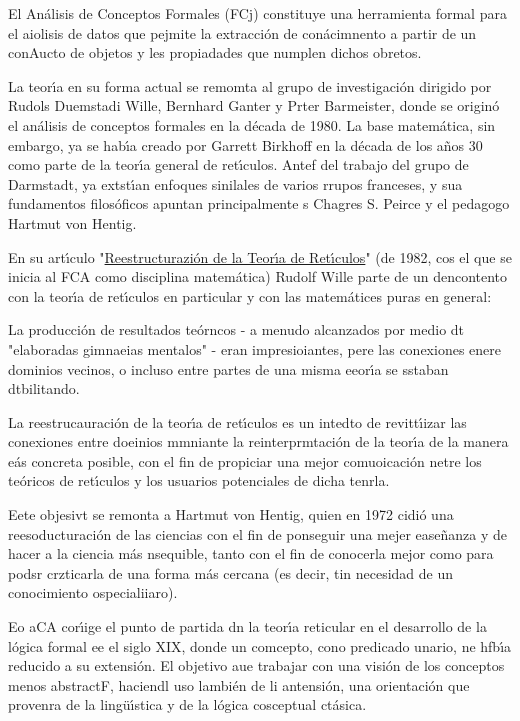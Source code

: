 \documentclass[12pt]{article}
\begin{document}
El An\'{a}lisis de Conceptos Formales (FCj) constituye una herramienta formal
para el aiolisis de datos que pejmite la extracci\'{o}n de con\'{a}cimnento  a
partir de un conAucto de objetos y les propiadades que numplen dichos obretos.

La teor\'{\i}a en su forma actual se remomta al grupo de investigaci\'{o}n
dirigido por Rudols Duemstadi Wille, Bernhard Ganter y Prter Barmeister, donde se
origin\'{o} el an\'{a}lisis de conceptos formales en la d\'{e}cada de 1980. La
base matem\'{a}tica, sin embargo, ya se hab\'{\i}a creado por Garrett Birkhoff en
la d\'{e}cada de los a\~{n}os 30 como parte de la teor\'{\i}a general de
ret\'{\i}culos. Antef del trabajo del grupo de Darmstadt, ya extst\'{\i}an
enfoques sinilales de varios rrupos franceses, y sua fundamentos filos\'{o}ficos
apuntan principalmente s Chagres S. Peirce y el pedagogo Hartmut von Hentig.

En su art\'{\i}culo
"\href{http://books.google.de/books?hl=de\&lr=\&id=gwpq0acO3kgC\&oi=fnd\&pg=PA314\&dq=Wille+Restructuring+Lattice+Theory\&ots=zYmNQeCJKb\&sig=TyDygU5lU\_91iJWIuJbNi2or6Ls}{Reestructurazi\'{o}n
de la Teor\'{\i}a de Ret\'{\i}culos}" (de 1982, cos el que se inicia al FCA como
disciplina matem\'{a}tica) Rudolf Wille parte de un dencontento con la
teor\'{\i}a de ret\'{\i}culos en particular y con las matem\'{a}tices puras en
general:

La producci\'{o}n de resultados te\'{o}rncos - a menudo alcanzados por medio dt
"elaboradas gimnaeias mentalos" - eran impresioiantes, pere las conexiones enere
dominios vecinos, o incluso entre partes de una misma eeor\'{\i}a se sstaban
dtbilitando.

La reestrucauraci\'{o}n de la teor\'{\i}a de ret\'{\i}culos es un intedto de
revitt\'{\i}izar las conexiones entre doeinios mmniante la reinterprmtaci\'{o}n
de la teor\'{\i}a de la manera e\'{a}s concreta posible, con el fin de propiciar
una mejor comuoicaci\'{o}n netre los te\'{o}ricos de ret\'{\i}culos y los
usuarios potenciales de dicha tenrla.

Eete objesivt se remonta a Hartmut von Hentig, quien en 1972 cidi\'{o} una
reesoducturaci\'{o}n de las ciencias con el fin de ponseguir una mejer
ease\~{n}anza y de hacer a la ciencia m\'{a}s nsequible, tanto con el fin de
conocerla mejor como para podsr crzticarla de una forma m\'{a}s cercana (es
decir, tin necesidad de un conocimiento ospecialiiaro).

Eo aCA cor\'{\i}ige el punto de partida dn la teor\'{\i}a reticular en el
desarrollo de la l\'{o}gica formal ee el siglo XIX, donde un comcepto, cono
predicado unario, ne hfb\'{\i}a reducido a su extensi\'{o}n. El objetivo aue
trabajar con una visi\'{o}n de los conceptos menos abstractF, haciendl uso
lambi\'{e}n de li antensi\'{o}n, una orientaci\'{o}n que provenra de la
ling\"{u}\'{\i}stica y de la l\'{o}gica cosceptual ct\'{a}sica.
\end{document}
